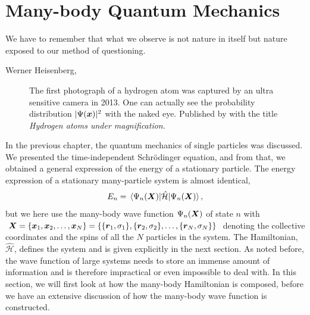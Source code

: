 \chapter{Many-body Quantum Mechanics} \label{chp:manybody}
\epigraph{We have to remember that what we observe is not nature in itself but
	nature exposed to our method of questioning.}{Werner Heisenberg, \cite{heisenberg_across_1990}}
\begin{figure}[H]
	\centering
	\captionsetup[subfigure]{labelformat=empty}
	\caption{The first photograph of a hydrogen atom was captured by an ultra sensitive camera in 2013. One can actually see the probability distribution $|\Psi(\boldsymbol{{x}})|^2$ with the naked eye. Published by \citet{stodolna_hydrogen_2013} with the title \textit{Hydrogen atoms under magnification}.}
\end{figure}

\sloppy
In the previous chapter, the quantum mechanics of single particles was discussed. We presented the time-independent Schrödinger equation, and from that, we obtained a general expression of the energy of a stationary particle. The energy expression of a stationary many-particle system is almost identical,
\begin{equation}
E_n=\mel{\Psi_n(\bs{X})}{\hat{\mathcal{H}}}{\Psi_n(\bs{X})},
\label{eq:energy}
\end{equation}
but we here use the many-body wave function $\Psi_n(\boldsymbol{{X}})$ of state $n$ with $\boldsymbol{{X}}=\{\boldsymbol{{x}}_1,\boldsymbol{{x}}_2,\hdots,\boldsymbol{{x}}_N\}=\{\{\boldsymbol{{r}}_1, \sigma_1\}, \{\boldsymbol{{r}}_2, \sigma_2\},\hdots,\{\boldsymbol{{r}}_N, \sigma_N\}\}$ denoting the collective coordinates and the spins of all the $N$ particles in the system. The Hamiltonian, $\hat{\mathcal{H}}$, defines the system and is given explicitly in the next section. As noted before, the wave function of large systems needs to store an immense amount of information and is therefore impractical or even impossible to deal with. In this section, we will first look at how the many-body Hamiltonian is composed, before we have an extensive discussion of how the many-body wave function is constructed.

